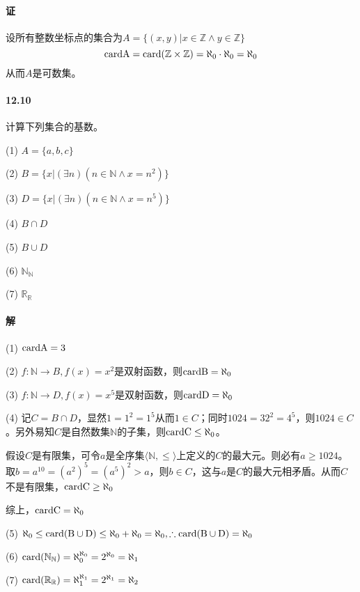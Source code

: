 \documentclass[UTF8]{ctexart}
\newcommand{\snatural}{\mathbb{N}}
\newcommand{\sinteger}{\mathbb{Z}}
\newcommand{\sreal}{\mathbb{R}}
\newcommand{\card}{\rm{card}}
\begin{document}
\paragraph{证}
    设所有整数坐标点的集合为$A = \{(x,y) | x \in \sinteger \land y \in \sinteger \}$
    $$\card A = \card(\sinteger \times \sinteger) = \aleph_0 \cdot \aleph_0 = \aleph_0$$
    从而$A$是可数集。

\paragraph{12.10} \label{12.10}
    计算下列集合的基数。
    
    (1) $A = \{a,b,c\}$

    (2) $B = \{x|(\exists n)(n \in\snatural \land x = n^2)\}$

    (3) $D = \{x|(\exists n)(n \in\snatural \land x = n^5)\}$

    (4) $B \cap D$

    (5) $B \cup D$

    (6) $\snatural_\snatural$
    
    (7) $\sreal_\sreal$

\paragraph{解}
    (1) $\card A = 3$

    (2) $f: \snatural \to B, f(x) = x^2$是双射函数，则$\card B = \aleph_0$

    (3) $f: \snatural \to D, f(x) = x^5$是双射函数，则$\card D= \aleph_0$

    (4) 记$C = B \cap D$，显然$1 = 1^2 = 1^5$从而$1 \in C$；同时$1024 = 32^2 = 4^5$，则$1024 \in C$。另外易知$C$是自然数集$\snatural$的子集，则$\card C \le \aleph_0$。

    假设$C$是有限集，可令$a$是全序集$\langle \snatural, \le \rangle$上定义的$C$的最大元。则必有$a \ge 1024$。取$b = a^10 = (a^2)^5 = (a^5)^2 > a$，则$b \in C$，这与$a$是$C$的最大元相矛盾。从而$C$不是有限集，$\card C \ge \aleph_0$

    综上，$\card C = \aleph_0$

    (5) $\aleph_0 \le \card(B \cup D) \le  \aleph_0 + \aleph_0 = \aleph_0, \therefore \card(B \cup D) = \aleph_0$

    (6) $\card(\snatural_\snatural) = \aleph_0^{\aleph_0} = 2^{\aleph_0} = \aleph_1$

    (7) $\card(\sreal_\sreal) = \aleph_1 ^ {\aleph_1} = 2^{\aleph_1} = \aleph_2$
\end{document}
